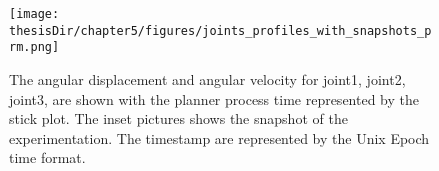 \begin{figure}
  \centering
  \captionsetup{justification=centering}
  \texttt{[image: \\thesisDir/chapter5/figures/joints\_profiles\_with\_snapshots\_prm.png]}
  \caption{The angular displacement and angular velocity for joint1, joint2, joint3, are shown with the planner process time represented by the stick plot. The inset pictures shows the snapshot of the experimentation. The timestamp are represented by the Unix Epoch time format.} 
  \label{fig:joints_profiles_with_snapshots_prm}
\end{figure}

